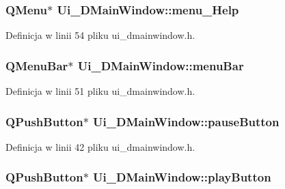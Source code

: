 \subsubsection[{menu\+\_\+\+Help}]{\setlength{\rightskip}{0pt plus 5cm}Q\+Menu$\ast$ Ui\+\_\+\+D\+Main\+Window\+::menu\+\_\+\+Help}\label{class_ui___d_main_window_ac2997077098614d72b21d29c7a48350c}


Definicja w linii 54 pliku ui\+\_\+dmainwindow.\+h.

\hypertarget{class_ui___d_main_window_a788ef749d82ca070e467e55cca0d47dd}{}
\subsubsection[{menu\+Bar}]{\setlength{\rightskip}{0pt plus 5cm}Q\+Menu\+Bar$\ast$ Ui\+\_\+\+D\+Main\+Window\+::menu\+Bar}\label{class_ui___d_main_window_a788ef749d82ca070e467e55cca0d47dd}


Definicja w linii 51 pliku ui\+\_\+dmainwindow.\+h.

\hypertarget{class_ui___d_main_window_a70e142e35db4995a1fefa082406bdef3}{}
\subsubsection[{pause\+Button}]{\setlength{\rightskip}{0pt plus 5cm}Q\+Push\+Button$\ast$ Ui\+\_\+\+D\+Main\+Window\+::pause\+Button}\label{class_ui___d_main_window_a70e142e35db4995a1fefa082406bdef3}


Definicja w linii 42 pliku ui\+\_\+dmainwindow.\+h.

\hypertarget{class_ui___d_main_window_ad87cbf39ac14374923ed2a2b11e8b1bf}{}
\subsubsection[{play\+Button}]{\setlength{\rightskip}{0pt plus 5cm}Q\+Push\+Button$\ast$ Ui\+\_\+\+D\+Main\+Window\+::play\+Button}\label{class_ui___d_main_window_ad87cbf39ac14374923ed2a2b11e8b1bf}


